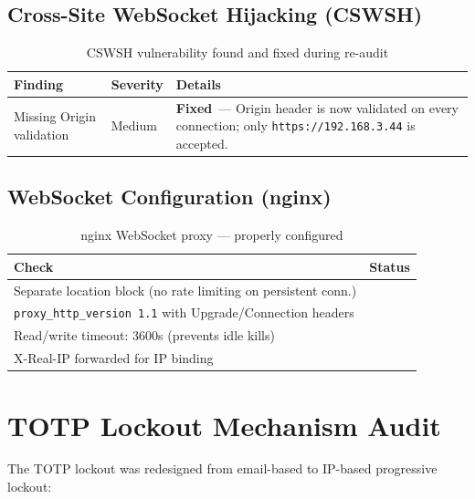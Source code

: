 \documentclass[12pt,a4paper]{article}
\newcommand{\pass}{\textcolor{success}{\checkmark}}
\newcommand{\fixd}{\textcolor{fixed}{\textbf{Fixed}}}
\begin{document}
\subsection{Cross-Site WebSocket Hijacking (CSWSH)}

\begin{table}[H]
\centering
\begin{tabularx}{\textwidth}{llX}
\toprule
\textbf{Finding} & \textbf{Severity} & \textbf{Details} \\
\midrule
Missing Origin validation & Medium & \fixd\ --- Origin header is now validated on every connection; only \texttt{https://192.168.3.44} is accepted. \\
\bottomrule
\end{tabularx}
\caption{CSWSH vulnerability found and fixed during re-audit}
\end{table}

\subsection{WebSocket Configuration (nginx)}

\begin{table}[H]
\centering
\begin{tabularx}{\textwidth}{Xc}
\toprule
\textbf{Check} & \textbf{Status} \\
\midrule
Separate location block (no rate limiting on persistent conn.) & \pass \\
\texttt{proxy\_http\_version 1.1} with Upgrade/Connection headers & \pass \\
Read/write timeout: 3600s (prevents idle kills) & \pass \\
X-Real-IP forwarded for IP binding & \pass \\
\bottomrule
\end{tabularx}
\caption{nginx WebSocket proxy --- properly configured}
\end{table}

\section{TOTP Lockout Mechanism Audit}

The TOTP lockout was redesigned from email-based to IP-based progressive lockout:
\end{document}
